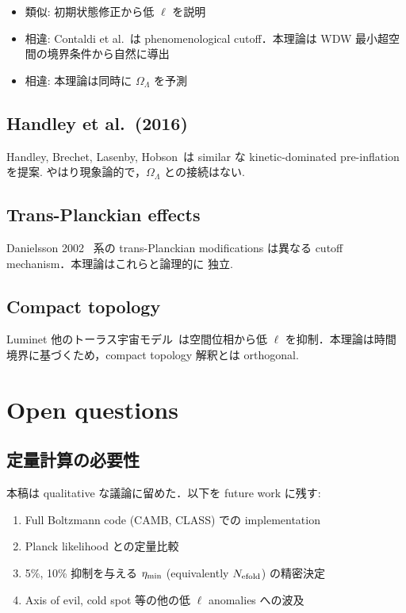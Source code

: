 \documentclass[11pt,a4paper]{article}
\begin{document}
\begin{itemize}
\item 類似: 初期状態修正から低 $\ell$ を説明
\item 相違: Contaldi et al.\ は phenomenological cutoff．本理論は
WDW 最小超空間の境界条件から自然に導出
\item 相違: 本理論は同時に $\Omega_\Lambda$ を予測
\end{itemize}

\subsection{Handley et al.\ (2016)}

Handley, Brechet, Lasenby, Hobson~\cite{Handley2016}は similar な
kinetic-dominated pre-inflation を提案. やはり現象論的で，$\Omega_\Lambda$
との接続はない.

\subsection{Trans-Planckian effects}

Danielsson 2002~\cite{Danielsson2002} 系の trans-Planckian
modifications は異なる cutoff mechanism．本理論はこれらと論理的に
独立.

\subsection{Compact topology}

Luminet 他のトーラス宇宙モデル~\cite{Luminet2003}は空間位相から低 $\ell$
を抑制．本理論は時間境界に基づくため，compact topology 解釈とは
orthogonal.

\section{Open questions}

\subsection{定量計算の必要性}

本稿は qualitative な議論に留めた．以下を future work に残す:

\begin{enumerate}
\item Full Boltzmann code (CAMB, CLASS) での implementation
\item Planck likelihood との定量比較
\item 5\%, 10\% 抑制を与える $\eta_{\rm min}$ (equivalently $N_{\rm efold}$) の精密決定
\item Axis of evil, cold spot 等の他の低 $\ell$ anomalies への波及
\end{enumerate}
\end{document}
